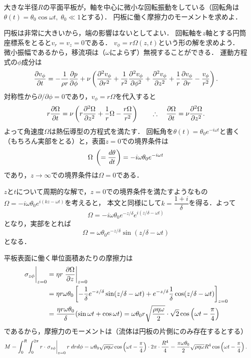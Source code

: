 \begin{mondai}{}{}
大きな半径$R$の平面平板が，軸を中心に微小な回転振動をしている（回転角は$\theta(t)=\theta_0 \cos \omega t, \; \theta_0 \ll 1$とする）．
円板に働く摩擦力のモーメントを求めよ．
\end{mondai}
\begin{kaitou}
円板は非常に大きいから，端の影響はないとしてよい．
回転軸を$z$軸とする円筒座標系をとると$v_r=v_z=0$である．
$v_\phi = r\Omega(z, t)$という形の解を求めよう．
微小振幅であるから，移流項は（$\omega$によらず）無視することができる．
運動方程式の$\phi$成分は
\[
    \pdv{v_\phi}{t} = -\frac{1}{\rho r} \pdv{p}{\phi} 
    + \nu \left( \pdv[2]{v_\phi}{r} + \frac{1}{r^2} \pdv[2]{v_\phi}{\phi} + \pdv[2]{v_\phi}{z} + \frac{1}{r} \pdv{v_\phi}{r} - \frac{v_\phi}{r^2} \right) .
\]
対称性から$\partial/\partial\phi=0$であり，$v_\phi=r\Omega$を代入すると
\[
    r \pdv{\Omega}{t} = \nu \left( r \pdv[2]{\Omega}{z} + \frac{1}{r} \Omega -\frac{r\Omega}{r^2} \right)
    \qquad\therefore\quad \pdv{\Omega}{t} = \nu \pdv[2]{\Omega}{z} .
\]
よって角速度$\Omega$は熱伝導型の方程式を満たす．
回転角を$\theta(t) = \theta_0 e^{-i\omega t}$と書く（もちろん実部をとる）と，表面$z=0$での境界条件は
\[
    \Omega \; \left( = \dv{\theta}{t} \right) = -i\omega \theta_0 e^{-i\omega t}
\]
であり，$z\to\infty$での境界条件は$\Omega=0$である．

$z$と$t$について周期的な解で，$z=0$での境界条件を満たすようなもの$\Omega=-i\omega\theta_0 e^{i(kz-\omega t)}$を考えると，
本文と同様にして$k=\dfrac{1+i}{\delta}$を得る．よって
\[
    \Omega = -i\omega \theta_0 e^{-z/\delta} e^{i(z/\delta-\omega t)}
\]
となり，実部をとれば
\[
    \Omega = \omega \theta_0 e^{-z/\delta} \sin(z/\delta-\omega t)
\]
となる．

平板表面に働く単位面積あたりの摩擦力は
\begin{align*}
    \eval{\sigma_{z\phi}}_{z=0} &= \eta r \eval{\pdv{\Omega}{z}}_{z=0} \\
    &= \eta r \omega\theta_0 \left[ -\frac{1}{\delta} e^{-z/\delta} \sin(z/\delta-\omega t) 
    + e^{-z/\delta} \frac{1}{\delta} \cos(z/\delta-\omega t) \right]_{z=0} \\
    &= \frac{\eta r \omega\theta_0}{\delta}(\sin\omega t + \cos\omega t) 
     = \omega\theta_0 r \sqrt{\frac{\rho\eta\omega}{2}} \cdot \sqrt{2} \cos \left( \omega t - \frac{\pi}{4} \right)
\end{align*}
であるから，摩擦力のモーメントは（流体は円板の片側にのみ存在するとする）
\[
    M = \int_{0}^{R}\int_{0}^{2\pi}r \cdot \eval{\sigma_{z\phi}}_{z=0} r \; dr d\phi
    = \omega\theta_0 \sqrt{\rho\eta\omega}  \cos \left( \omega t - \frac{\pi}{4} \right) \cdot 2\pi \cdot \frac{R^4}{4}
    = \frac{\pi\omega\theta_0}{2} \sqrt{\rho\eta\omega} R^4 \cos \left( \omega t - \frac{\pi}{4} \right).
\]



\end{kaitou}




